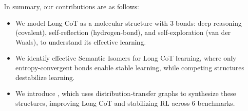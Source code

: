 In summary, our contributions are as follows:
\begin{itemize}[leftmargin=16pt, itemsep=0pt, topsep=0pt]
\item We model Long CoT as a molecular structure with 3 bonds: deep-reasoning (covalent), self-reflection (hydrogen-bond), and self-exploration (van der Waals), to understand its effective learning.
\item We identify effective Semantic Isomers for Long CoT learning, where only entropy-convergent bonds enable stable learning, while competing structures destabilize learning.
\item We introduce \method, which uses distribution-transfer graphs to synthesize these structures, improving Long CoT and stabilizing RL across 6 benchmarks.
\end{itemize}

